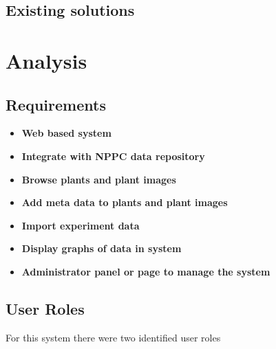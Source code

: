 \subsection{Existing solutions}



\section{Analysis}


\subsection{Requirements}

\begin{itemize}
\item \textbf{Web based system}
\item \textbf{Integrate with NPPC data repository}
\item \textbf{Browse plants and plant images}
\item \textbf{Add meta data to plants and plant images}
\item \textbf{Import experiment data}
\item \textbf{Display graphs of data in system}
\item \textbf{Administrator panel or page to manage the system}
\end{itemize}







\subsection{User Roles}
For this system there were two identified user roles

